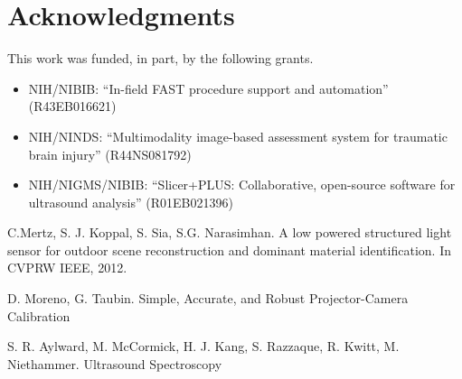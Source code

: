 \documentclass{llncs}
\begin{document}
\section*{Acknowledgments}
This work was funded, in part, by the following grants.

\begin{itemize}
	\item NIH/NIBIB: “In-field FAST procedure support and automation” (R43EB016621)
	\item NIH/NINDS: “Multimodality image-based assessment system for traumatic brain injury” (R44NS081792)
	\item NIH/NIGMS/NIBIB: “Slicer+PLUS: Collaborative, open-source software for ultrasound analysis” (R01EB021396)
\end{itemize}

%
%
\begin{thebibliography}{}
%
C.Mertz, S. J. Koppal, S. Sia, S.G. Narasimhan. A low powered structured light sensor for outdoor scene reconstruction and dominant material identification. In CVPRW IEEE, 2012.

D. Moreno, G. Taubin. Simple, Accurate, and Robust Projector-Camera Calibration

S. R. Aylward, M. McCormick, H. J. Kang, S. Razzaque, R. Kwitt, M. Niethammer. Ultrasound Spectroscopy

\end{thebibliography}
\end{document}
